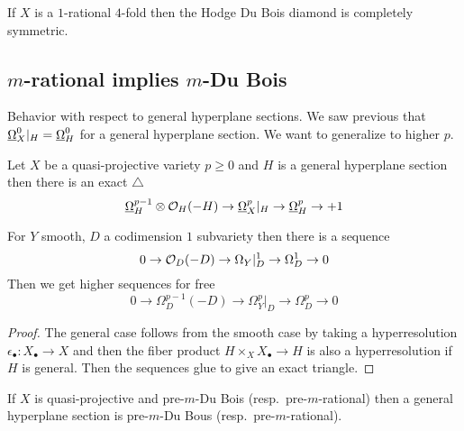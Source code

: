 \documentclass[12pt]{article}
\begin{document}
\begin{example}
If $X$ is a $1$-rational $4$-fold then the Hodge Du Bois diamond is completely symmetric. 
\end{example}

\subsection{$m$-rational implies $m$-Du Bois}

Behavior with respect to general hyperplane sections. We saw previous that $\underline{\Omega}_X^0|_H = \underline{\Omega}_H^0$ for a general hyperplane section. We want to generalize to higher $p$.

\begin{prop}
Let $X$ be a quasi-projective variety $p \ge 0$ and $H$ is a general hyperplane section then there is an exact $\triangle$
\[ \underline{\Omega}_H^{p-1} \otimes \mathcal{O}_{H}(-H) \to \underline{\Omega}_X^p|_H \to \underline{\Omega}_H^p \to +1 \]
\end{prop}

\begin{rmk}
For $Y$ smooth, $D$ a codimension $1$ subvariety then there is a sequence
\[ 0 \to \mathcal{O}_{D}(-D) \to \Omega_Y|_D^1 \to \Omega_D^1 \to 0 \]
Then we get higher sequences for free
\[ 0 \to \Omega_D^{p-1} (-D) \to \Omega_Y^p|_D \to \Omega_D^p \to 0 \]
\end{rmk}

\begin{proof}
The general case follows from the smooth case by taking a hyperresolution $\epsilon_\bullet : X_\bullet \to X$ and then the fiber product $H \times_X X_\bullet \to H$ is also a hyperresolution if $H$ is general. Then the sequences glue to give an exact triangle. 
\end{proof}

\begin{theorem}
If $X$ is quasi-projective and pre-$m$-Du Bois (resp.\ pre-$m$-rational) then a general hyperplane section is pre-$m$-Du Bous (resp.\ pre-$m$-rational).
\end{theorem}
\end{document}
